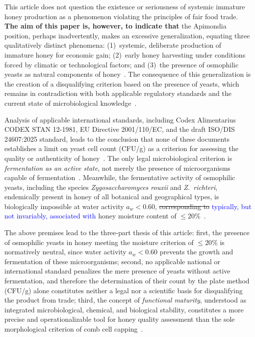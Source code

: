 This article does not question the existence or seriousness of
systemic immature honey production as a phenomenon violating the
principles of fair food trade. \textbf{The aim of this paper is,
however, to indicate that} the Apimondia position, perhaps
inadvertently, makes an excessive generalization, equating three
qualitatively distinct phenomena:
(1)~systemic, deliberate production of immature honey for economic
gain; (2)~early honey harvesting under conditions forced by climatic
or technological factors; and (3)~the presence of osmophilic yeasts
as natural components of honey~\cite{garcia2025,munitis1976}.
The consequence of this generalization is the creation of a
disqualifying criterion based on the presence of yeasts, which
remains in contradiction with both applicable regulatory standards
and the current state of microbiological
knowledge~\cite{codex_stan12, rodriguezmachado2024}.

Analysis of applicable international standards, including Codex
Alimentarius CODEX STAN 12-1981, EU Directive 2001/110/EC, and the
draft ISO/DIS 24607:2025 standard, leads to the conclusion that
none of these documents establishes a limit on yeast cell count
(CFU/g) as a criterion for assessing the quality or authenticity of
honey~\cite{codex_stan12}.
The only legal microbiological criterion is \emph{fermentation as an
active state}, not merely the presence of microorganisms capable of
fermentation~\cite{codex_stan12}.
Meanwhile, the fermentative activity of osmophilic yeasts, including
the species \textit{Zygosaccharomyces rouxii} and \textit{Z.~richteri},
endemically present in honey of all botanical and geographical types,
is biologically impossible at water activity $a_w < 0.60$,
\sout{corresponding to} \textcolor{blue}{typically, but not invariably, associated with}
honey moisture content of $\leq 20\%$~\cite{zamora2006,ruegg1981}.

The above premises lead to the three-part thesis of this article:
first, the presence of osmophilic yeasts in honey meeting the moisture
criterion of $\leq 20\%$ is normatively neutral, since water activity
$a_w < 0.60$ prevents the growth and fermentation of these
microorganisms; second, no applicable national or international
standard penalizes the mere presence of yeasts without active
fermentation, and therefore the determination of their count by the
plate method (CFU/g) alone constitutes neither a legal nor a scientific
basis for disqualifying the product from trade; third, the concept of
\emph{functional maturity}, understood as integrated microbiological,
chemical, and biological stability, constitutes a more precise and
operationalizable tool for honey quality assessment than the sole
morphological criterion of comb cell
capping~\cite{zhang2021,guo2020,sun2021}.

